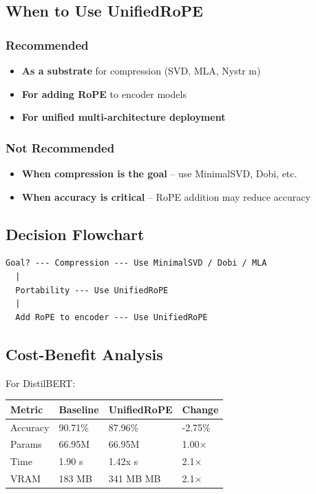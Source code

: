 \subsection{When to Use UnifiedRoPE}

\subsubsection{Recommended}

\begin{itemize}
\item \textbf{As a substrate} for compression (SVD, MLA, Nystr m)
\item \textbf{For adding RoPE} to encoder models
\item \textbf{For unified multi-architecture deployment}

\end{itemize}
\subsubsection{Not Recommended}

\begin{itemize}
\item \textbf{When compression is the goal} -- use MinimalSVD, Dobi, etc.
\item \textbf{When accuracy is critical} -- RoPE addition may reduce accuracy

\end{itemize}
\subsection{Decision Flowchart}

\begin{lstlisting}
Goal? --- Compression --- Use MinimalSVD / Dobi / MLA
  |
  Portability --- Use UnifiedRoPE
  |
  Add RoPE to encoder --- Use UnifiedRoPE
\end{lstlisting}

\subsection{Cost-Benefit Analysis}

For DistilBERT:

\begin{table}[H]
\centering
\small
\begin{tabular}{llll}
\toprule
\textbf{Metric} & \textbf{Baseline} & \textbf{UnifiedRoPE} & \textbf{Change} \\
\midrule
Accuracy & 90.71\% & 87.96\% & -2.75\% \\
Params & 66.95M & 66.95M & 1.00$\times$ \\
Time & 1.90 s & 1.42x s & 2.1$\times$ \\
VRAM & 183 MB & 341 MB MB & 2.1$\times$ \\
\bottomrule
\end{tabular}
\end{table}

